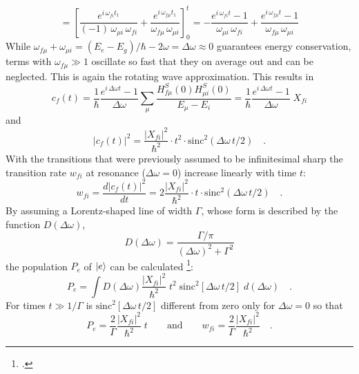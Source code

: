 \begin{equation}
= \left[  \frac{e^{i \,\omega_{fi} t_1}}{(-1)
\,\omega_{\mu i} \, \omega_{fi}} %
+   \frac{e^{i \,\omega_{ f \mu } t_1}}{\omega_{f \mu}\,
\omega_{\mu i}} \right]_0^t %
= -  \frac{e^{i \,\omega_{fi} t} -1}{
\omega_{\mu i} \, \omega_{fi} } %
+   \frac{e^{i \,\omega_{ f \mu } t} -1}{\omega_{f \mu}\,
\omega_{\mu i}}  %
\end{equation}
While $\omega_{f \mu}+\omega_{ \mu i}= (E_e - E_g)/ \hbar - 2 \omega = \Delta \omega \approx 0$ guarantees  energy conservation,  terms with 
 $\omega_{f \mu} \gg 1$ oscillate so fast that they
on average out and can be neglected. This is again the rotating wave approximation. This   results in
\begin{equation}
c_f(t) =  \frac{1}{\hbar} \frac{e^{i \,\Delta \omega t} -1}{
\Delta \omega } \sum_{\mu} \frac{H^S_{f \mu} (0) H^S_{\mu i}
(0)}{E_{\mu} - E_i} =  \frac{1}{\hbar} \frac{e^{i \,\Delta \omega t}
-1}{ \Delta \omega } \; X_{fi}
\end{equation}
and
\begin{equation}
|c_f(t)|^2 = \frac{|X_{fi}|^2}{\hbar^2} \cdot t^2 \cdot
\text{sinc}^2(\Delta \omega \,t / 2) \quad .
\end{equation}
With the transitions that were previously assumed to be infinitesimal sharp
the transition rate $w_{fi}$ at resonance ($\Delta \omega =
0$) increase linearly with time $t$:
\begin{equation}
 w_{fi} = \frac{d |c_f(t)|^2}{dt} = 2 \frac{|X_{fi}|^2}{\hbar^2} \cdot t \cdot
\text{sinc}^2(\Delta \omega \,t / 2) \quad .
\end{equation}
By assuming a Lorentz-shaped line of width $\Gamma$, whose
form is described by the function $D(\Delta \omega)$,
\begin{equation}
D(\Delta \omega) = \frac{\Gamma / \pi}{(\Delta \omega)^2 +
\Gamma^2}
\end{equation}
the population $P_e$ of $\ket{e}$ can be calculated 
\footcite{mystre_quantum_optics}:
\begin{equation}
P_e = \int D(\Delta \omega) \frac{|X_{fi}|^2}{\hbar^2} \; t^2 \;
\text{sinc}^2\left[ \Delta \omega  \,t / 2 \right] \; d (\Delta
\omega) \quad .
\end{equation}
For times $t \gg 1 / \Gamma$ is $\text{sinc}^2\left[ \Delta
\omega \,t / 2 \right]$ different from zero only for $\Delta \omega = 0$  so that
\begin{equation}
P_e =  \frac{2}{ \Gamma} \frac{|X_{fi}|^2}{ \hbar^2} \; t \qquad
\text{and} \qquad w_{fi} =  \frac{2}{ \Gamma} \frac{|X_{fi}|^2}{
\hbar^2} \quad . \label{eq:tpe_pe_xfi}
\end{equation}

